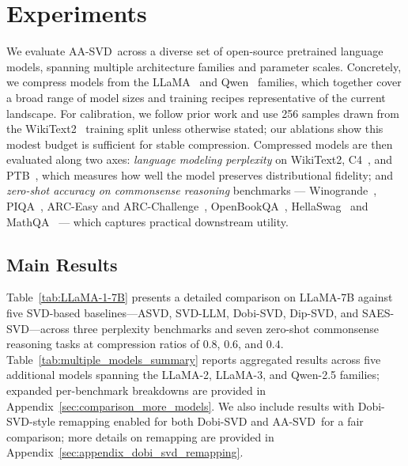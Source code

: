 \documentclass[10pt]{article} %
\theoremstyle{definition}
\theoremstyle{remark}
\newcommand{\ourmethod}{{\textsc{AA-SVD}}}
\newcommand{\ourmethodlight}{{\textsc{AA-SVD}}}
\begin{document}
\section{Experiments}
\label{sec:exp}

We evaluate \ourmethod\ across a diverse set of open-source pretrained language models, spanning multiple architecture families and parameter scales.
Concretely, we compress models from the LLaMA~\citep{touvron2023LLaMA} and Qwen~\citep{bai2023qwen} families, which together cover a broad range of model sizes and training recipes representative of the current landscape.
For calibration, we follow prior work and use 256 samples drawn from the WikiText2~\citep{merity2016pointer} training split unless otherwise stated; our ablations show this modest budget is sufficient for stable compression.
Compressed models are then evaluated along two axes: \emph{language modeling perplexity} on WikiText2, C4~\citep{raffel2020exploring}, and PTB~\citep{marcinkiewicz1994building}, which measures how well the model preserves distributional fidelity; and \emph{zero-shot accuracy on commonsense reasoning} benchmarks --- Winogrande~\citep{sakaguchi2021winogrande}, PIQA~\citep{bisk2020piqa}, ARC-Easy and ARC-Challenge~\citep{clark2018think}, OpenBookQA~\citep{mihaylov2018openbookqa}, HellaSwag~\citep{zellers2019hellaswag} and MathQA~\citep{amini2019mathqa} --- which captures practical downstream utility. %

\subsection{Main Results}

Table~\ref{tab:LLaMA-1-7B} presents a detailed comparison on LLaMA-7B against five SVD-based baselines---ASVD, SVD-LLM, Dobi-SVD, Dip-SVD, and SAES-SVD---across three perplexity benchmarks and seven zero-shot commonsense reasoning tasks at compression ratios of $0.8$, $0.6$, and $0.4$.
Table~\ref{tab:multiple_models_summary} reports aggregated results across five additional models spanning the LLaMA-2, LLaMA-3, and Qwen-2.5 families; expanded per-benchmark breakdowns are provided in Appendix~\ref{sec:comparison_more_models}. We also include results with Dobi-SVD-style remapping enabled for both Dobi-SVD and \ourmethodlight~for a fair comparison; more details on remapping are provided in Appendix~\ref{sec:appendix_dobi_svd_remapping}.
\end{document}
